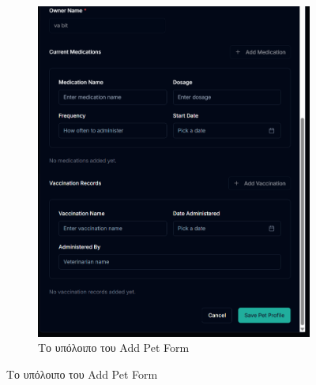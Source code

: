 \documentclass[12pt,a4paper,twoside]{book}
\begin{document}
\begin{figure}[H]
\begin{subfigure}[b]{0.48\textwidth}
        \includegraphics[width=\textwidth,height=0.4\textheight,keepaspectratio]{Resources/Final UI/add-pet-2.png}
        \caption{Το υπόλοιπο του Add Pet Form}\label{fig:add-pet-form-screen}
    \end{subfigure}
\end{figure}
\end{document}
